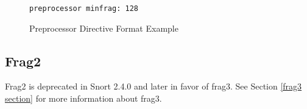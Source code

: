 \documentclass[english]{report}
\newenvironment{note}{
\samepage
    \vspace{10pt}{\textsf{
        {\hspace{7pt}\Huge{$\triangle$\hspace{-12.5pt}{\Large{$^!$}}}}\hspace{5pt}
        {\Large{NOTE}}
    }
    }
   \begin{center}
    \par\vspace{-17pt}

    \begin{lrbox}{\savepar}
    \begin{minipage}[r]{6in}
}
{
    \end{minipage}
    \end{lrbox}
    \fbox{
        \usebox{
            \savepar
	}
    }
    \par\vskip10pt
    \end{center}
}
\newenvironment{note}{
        \begin{rawhtml}
        <p><table border="1"><tr><td><b>
        Note:&nbsp;&nbsp;</b>
        \end{rawhtml}
}{
        \begin{rawhtml}
        </b></td></tr></table></p>
        \end{rawhtml}
}
\begin{document}
\begin{figure}[!hbpt]
\begin{verbatim}
preprocessor minfrag: 128
\end{verbatim}

\caption{\label{Preprocessor Example}Preprocessor Directive Format Example}
\end{figure}


\subsection{Frag2\label{Frag2 Section}}

\begin{note}
Frag2 is deprecated in Snort 2.4.0 and later in favor of frag3. See Section \ref{frag3 section} for more information about frag3.
\end{note}
\end{document}
